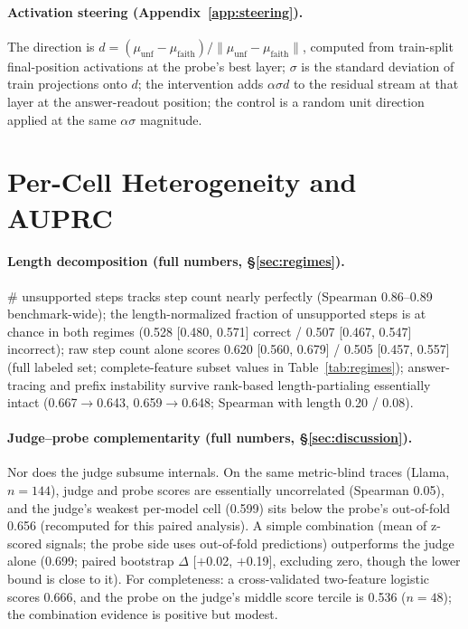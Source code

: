 \documentclass{article}
\begin{document}
\paragraph{Activation steering (Appendix~\ref{app:steering}).} The direction is $d = (\mu_{\mathrm{unf}} - \mu_{\mathrm{faith}})/\lVert\mu_{\mathrm{unf}} - \mu_{\mathrm{faith}}\rVert$, computed from train-split final-position activations at the probe's best layer; $\sigma$ is the standard deviation of train projections onto $d$; the intervention adds $\alpha\sigma d$ to the residual stream at that layer at the answer-readout position; the control is a random unit direction applied at the same $\alpha\sigma$ magnitude.

\section{Per-Cell Heterogeneity and AUPRC}
\label{app:forest}

\paragraph{Length decomposition (full numbers, \S\ref{sec:regimes}).} \# unsupported steps tracks step count nearly perfectly (Spearman 0.86--0.89 benchmark-wide); the length-normalized fraction of unsupported steps is at chance in both regimes (0.528 [0.480, 0.571] correct / 0.507 [0.467, 0.547] incorrect); raw step count alone scores 0.620 [0.560, 0.679] / 0.505 [0.457, 0.557] (full labeled set; complete-feature subset values in Table~\ref{tab:regimes}); answer-tracing and prefix instability survive rank-based length-partialing essentially intact (0.667$\to$0.643, 0.659$\to$0.648; Spearman with length 0.20 / 0.08).

\paragraph{Judge--probe complementarity (full numbers, \S\ref{sec:discussion}).} Nor does the judge subsume internals. On the same metric-blind traces (Llama, $n{=}144$), judge and probe scores are essentially uncorrelated (Spearman 0.05), and the judge's weakest per-model cell (0.599) sits below the probe's out-of-fold 0.656 (recomputed for this paired analysis). A simple combination (mean of z-scored signals; the probe side uses out-of-fold predictions) outperforms the judge alone (0.699; paired bootstrap $\Delta$ [$+$0.02, $+$0.19], excluding zero, though the lower bound is close to it). For completeness: a cross-validated two-feature logistic scores 0.666, and the probe on the judge's middle score tercile is 0.536 ($n{=}48$); the combination evidence is positive but modest.
\end{document}
